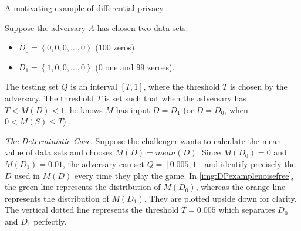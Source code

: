 \begin{protocol}[tbh!]
    \centering
    \caption{A motivating example of differential privacy.}
    \label{prot:motivationexampleDP}
\end{protocol}
\FloatBarrier

Suppose the adversary $A$ has chosen two data sets:
\begin{itemize}
    \item $D_{0}=\left\{ 0, 0, 0,\ldots ,0\right\} $ ($100$ zeros)
    \item $D_{1}=\left\{ 1, 0, 0,\ldots ,0\right\} $ ($0$ one and $99$ zeroes).
\end{itemize}

The testing set $Q$ is an interval $\left[ T,1\right] $, where the  threshold $T$ is chosen by the adversary. The threshold $T$ is set such that when the adversary has $T<M\left( D\right) < 1$, he knows $M$ has input $D=D_{1}$ (or $D=D_{0}$, when $0<M\left( S\right) \leq T$) .

\textit{The Deterministic Case}. Suppose the challenger wants to calculate the mean value of data sets and  chooses $M\left( D\right) =mean\left( D \right) $. Since $M\left( D_{0}\right) =0$ and $M\left( D_{1}\right) =0.01$, the adversary can set $Q =\left[ 0.005,1\right] $ and identify precisely the $D$ used in $M\left( D\right) $ every time they play the game. In \autoref{img:DPexamplenoisefree}, the green line represents the distribution of $M\left( D_{0}\right)$, whereas the orange line represents the distribution of $M\left( D_{1}\right)$. They are plotted upside down for clarity. The vertical dotted line represents the threshold $T=0.005$ which separates $D_{0}$ and $D_{1}$ perfectly.

